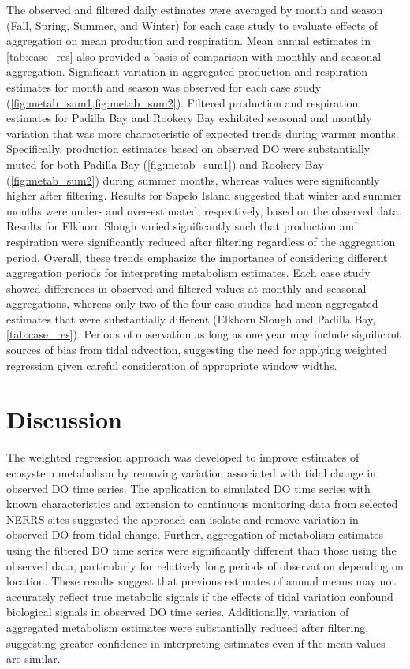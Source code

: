 \documentclass[letterpaper,12pt,oneside]{article}\usepackage[]{graphicx}\usepackage[]{color}
\begin{document}
The observed and filtered daily estimates were averaged by month and season (Fall, Spring, Summer, and Winter) for each case study to evaluate effects of aggregation on mean production and respiration.  Mean annual estimates in \cref{tab:case_res} also provided a basis of comparison with monthly and seasonal aggregation. Significant variation in aggregated production and respiration estimates for month and season was observed for each case study (\cref{fig:metab_sum1,fig:metab_sum2}).  Filtered production and respiration estimates for Padilla Bay and Rookery Bay exhibited seasonal and monthly variation that was more characteristic of expected trends during warmer months.  Specifically, production estimates based on observed \ac{DO} were substantially muted for both Padilla Bay (\cref{fig:metab_sum1}) and Rookery Bay (\cref{fig:metab_sum2}) during summer months, whereas values were significantly higher after filtering. Results for Sapelo Island suggested that winter and summer months were under- and over-estimated, respectively, based on the observed data.  Results for Elkhorn Slough varied significantly such that production and respiration were significantly reduced after filtering regardless of the aggregation period.  Overall, these trends emphasize the importance of considering different aggregation periods for interpreting metabolism estimates.  Each case study showed differences in observed and filtered values at monthly and seasonal aggregations, whereas only two of the four case studies had mean aggregated estimates that were substantially different (Elkhorn Slough and Padilla Bay, \cref{tab:case_res}).  Periods of observation as long as one year may include significant sources of bias from tidal advection, suggesting the need for applying weighted regression given careful consideration of appropriate window widths.       

 

\section{Discussion}

The weighted regression approach was developed to improve estimates of ecosystem metabolism by removing variation associated with tidal change in observed \ac{DO} time series.  The application to simulated \ac{DO} time series with known characteristics and extension to continuous monitoring data from selected \ac{NERRS} sites suggested the approach can isolate and remove variation in observed \ac{DO} from tidal change.  Further, aggregation of metabolism estimates using the filtered \ac{DO} time series were significantly different than those using the observed data, particularly for relatively long periods of observation depending on location. These results suggest that previous estimates of annual means may not accurately reflect true metabolic signals if the effects of tidal variation confound biological signals in observed \ac{DO} time series.  Additionally, variation of aggregated metabolism estimates were substantially reduced after filtering, suggesting greater confidence in interpreting estimates even if the mean values are similar.
\end{document}
